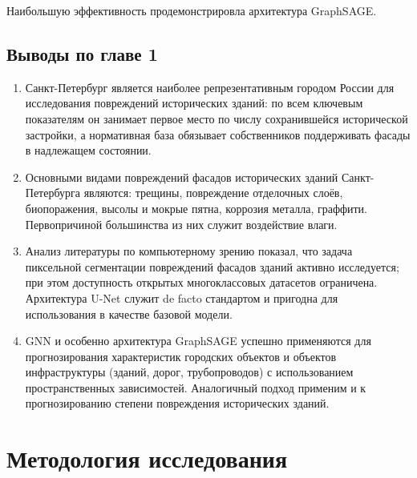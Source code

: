 \documentclass[14pt]{extarticle}
\begin{document}
Наибольшую эффективность продемонстрировла архитектура GraphSAGE. 


\subsection{Выводы по главе 1}
\label{subsec:ch1_conclusions}

\begin{enumerate}[leftmargin=*, label=\arabic*.]
    \item Санкт-Петербург является наиболее репрезентативным городом
          России для исследования повреждений исторических зданий: по всем
          ключевым показателям он занимает первое место по числу сохранившейся
          исторической застройки, а нормативная база обязывает собственников
          поддерживать фасады в надлежащем состоянии.
    \item Основными видами повреждений фасадов исторических зданий
          Санкт-Петербурга являются: трещины, повреждение отделочных
          слоёв, биопоражения, высолы и мокрые пятна, коррозия металла, граффити. Первопричиной
          большинства из них служит воздействие влаги.
    \item Анализ литературы по компьютерному зрению показал, что задача
          пиксельной сегментации повреждений фасадов зданий активно
          исследуется; при этом доступность открытых многоклассовых датасетов
          ограничена. Архитектура U-Net служит de facto стандартом и пригодна
          для использования в качестве базовой модели.
    \item GNN и особенно архитектура GraphSAGE успешно применяются для прогнозирования характеристик
          городских объектов и объектов инфраструктуры (зданий, дорог,
          трубопроводов) с использованием пространственных зависимостей.
          Аналогичный подход применим и к прогнозированию степени повреждения
          исторических зданий.
\end{enumerate}

\newpage

\section{Методология исследования}
\label{sec:method}
\end{document}
